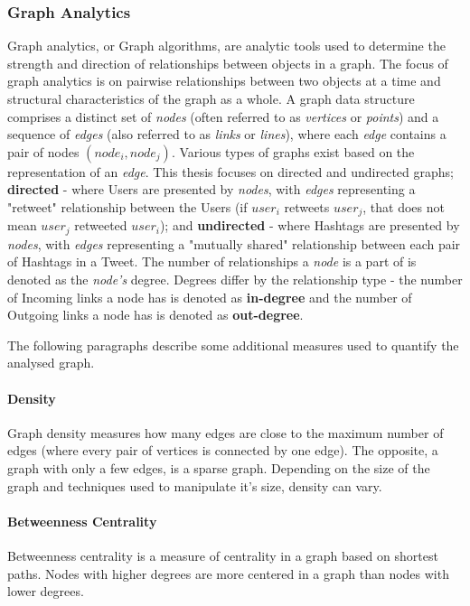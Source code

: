 \clearpage


\clearpage
\subsubsection{Graph Analytics}
\label{subsubsec:methods-data-analysis:graph-analysis}

Graph analytics, or Graph algorithms, are analytic tools used to determine the strength and direction of relationships between objects in a graph. The focus of graph analytics is on pairwise relationships between two objects at a time and structural characteristics of the graph as a whole\cite{nvidia2022graphanalytics}. A graph data structure comprises a distinct set of \textit{nodes} (often referred to as \textit{vertices} or \textit{points}) and a sequence of \textit{edges} (also referred to as \textit{links} or \textit{lines}), where each \textit{edge} contains a pair of nodes \((node_i, node_j)\). Various types of graphs exist based on the representation of an \textit{edge}. This thesis focuses on directed and undirected graphs; \textbf{directed} - where Users are presented by \textit{nodes}, with \textit{edges} representing a "retweet" relationship between the Users (if \(user_i\) retweets \(user_j\), that does not mean \(user_j\) retweeted \(user_i\)); and \textbf{undirected} - where Hashtags are presented by \textit{nodes}, with \textit{edges} representing a "mutually shared" relationship between each pair of Hashtags in a Tweet. The number of relationships a \textit{node} is a part of is denoted as the \textit{node's} degree. Degrees differ by the relationship type - the number of Incoming links a node has is denoted as \textbf{in-degree} and the number of Outgoing links a node has is denoted as \textbf{out-degree}. 

The following paragraphs describe some additional measures used to quantify the analysed graph.

\paragraph{Density} Graph density measures how many edges are close to the maximum number of edges (where every pair of vertices is connected by one edge). The opposite, a graph with only a few edges, is a sparse graph. Depending on the size of the graph and techniques used to manipulate it's size, density can vary.

\paragraph{Betweenness Centrality} Betweenness centrality is a measure of centrality in a graph based on shortest paths. Nodes with higher degrees are more centered in a graph than nodes with lower degrees.

